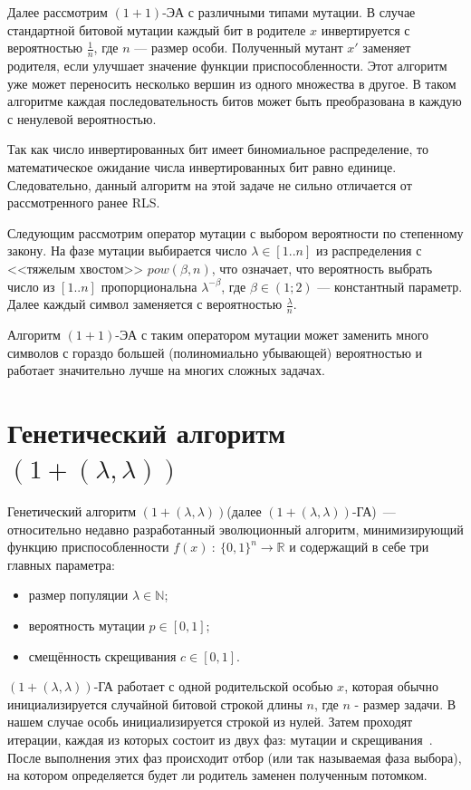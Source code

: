 \documentclass[times]{itmo-student-thesis}
\newcommand{\alglambda}{${(1 + (\lambda , \lambda))}$\xspace}
\newcommand{\alglambdaf}{${(1 + (\lambda , \lambda))}$-ГА\xspace}
\newcommand{\oea}{\mbox{$(1 + 1)$-ЭА}\xspace}
\newcommand{\N}{{\mathbb N}}
\newcommand{\R}{{\mathbb R}}
\begin{document}
Далее рассмотрим \oea с различными типами мутации. В случае стандартной битовой мутации каждый бит в родителе $x$ инвертируется с вероятностью $\frac{1}{n}$, где $n$ --- размер особи.
Полученный мутант $x'$ заменяет родителя, если улучшает значение функции приспособленности.
Этот алгоритм уже может переносить несколько вершин из одного множества в другое. В таком алгоритме каждая последовательность битов может быть преобразована в каждую с ненулевой вероятностью.

Так как число инвертированных бит имеет биномиальное распределение, то математическое ожидание числа инвертированных бит равно единице.
Следовательно, данный алгоритм на этой задаче не сильно отличается от рассмотренного ранее RLS.

Следующим рассмотрим оператор мутации с выбором вероятности по степенному закону. На фазе мутации выбирается число $\lambda \in [1..n]$ из распределения с <<тяжелым хвостом>> $pow(\beta, n)$, что означает, что  вероятность выбрать число из $[1..n]$ пропорциональна $\lambda^{-\beta}$, где $\beta \in (1; 2)$ --- константный параметр.
Далее каждый символ заменяется с вероятностью $\frac{\lambda}{n}$.

Алгоритм \oea с таким оператором мутации может заменить много символов с гораздо большей (полиномиально убывающей) вероятностью и работает значительно лучше на многих сложных задачах.

\section{Генетический алгоритм \alglambda}

Генетический алгоритм \alglambda(далее \alglambdaf)~--- относительно недавно разработанный эволюционный алгоритм, минимизирующий функцию приспособленности $f(x)~:~\{0, 1\}^n \rightarrow \R$ и содержащий в себе три главных параметра:
\begin{itemize}
   \item размер популяции $\lambda \in \N$;
   \item вероятность мутации $p \in [0, 1]$;
   \item смещённость скрещивания $c \in [0, 1]$.
\end{itemize}
\alglambdaf работает с одной родительской особью $x$, которая обычно инициализируется случайной битовой строкой длины $n$, где $n$ - размер задачи. В нашем случае особь инициализируется строкой из нулей. Затем проходят итерации, каждая из которых состоит из двух фаз: мутации и скрещивания~\cite{DoerrDE15}. После выполнения этих фаз происходит отбор (или так называемая фаза выбора), на котором определяется будет ли родитель заменен полученным потомком.
\end{document}

